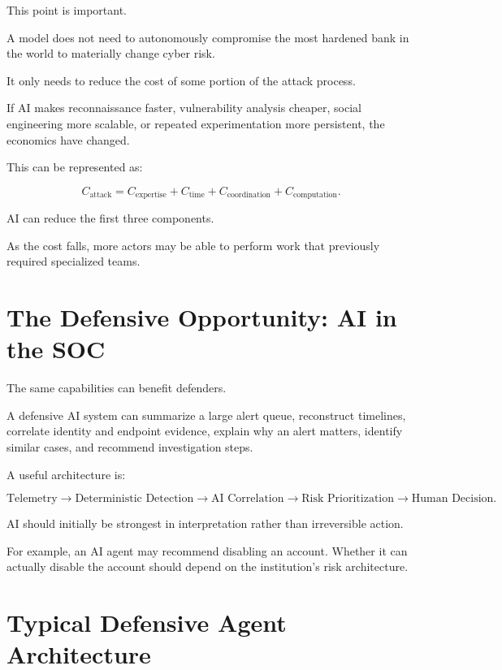 This point is important.

A model does not need to autonomously compromise the most hardened bank in the world to materially change cyber risk.

It only needs to reduce the cost of some portion of the attack process.

If AI makes reconnaissance faster, vulnerability analysis cheaper, social engineering more scalable, or repeated experimentation more persistent, the economics have changed.

This can be represented as:

\begin{equation}
C_{\text{attack}}
=
C_{\text{expertise}}
+
C_{\text{time}}
+
C_{\text{coordination}}
+
C_{\text{computation}}.
\end{equation}

AI can reduce the first three components.

As the cost falls, more actors may be able to perform work that previously required specialized teams.

\section{The Defensive Opportunity: AI in the SOC}

The same capabilities can benefit defenders.

A defensive AI system can summarize a large alert queue, reconstruct timelines, correlate identity and endpoint evidence, explain why an alert matters, identify similar cases, and recommend investigation steps.

A useful architecture is:

\begin{equation}
\text{Telemetry}
\rightarrow
\text{Deterministic Detection}
\rightarrow
\text{AI Correlation}
\rightarrow
\text{Risk Prioritization}
\rightarrow
\text{Human Decision}.
\end{equation}

AI should initially be strongest in interpretation rather than irreversible action.

For example, an AI agent may recommend disabling an account. Whether it can actually disable the account should depend on the institution's risk architecture.

\section{Typical Defensive Agent Architecture}

